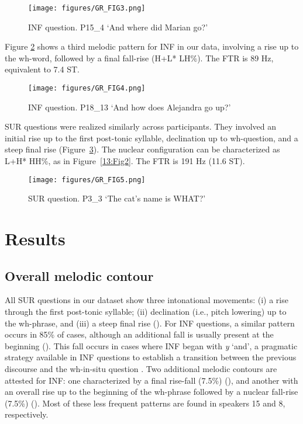 \documentclass[output=paper,colorlinks,citecolor=brown,draftmode]{langscibook}
\begin{document}
\begin{figure}
    \texttt{[image: figures/GR\_FIG3.png]}
    \caption{INF question. P15\_4  ‘And where did Marian go?’}
    \label{13:Fig3}
\end{figure}

Figure \ref{13:Fig4} shows a third melodic pattern for INF in our data, involving a rise up to the wh-word, followed by a final fall-rise (H+L* LH\%). The FTR is 89 Hz, equivalent to 7.4 ST.

\begin{figure}
    \texttt{[image: figures/GR\_FIG4.png]}
    \caption{INF question. P18\_13  ‘And how does Alejandra go up?’}
    \label{13:Fig4}
\end{figure}

SUR questions were realized similarly across participants. They involved an initial rise up to the first post-tonic syllable, declination up to wh-question, and a steep final rise (Figure~\ref{13:Fig5}). The nuclear configuration can be characterized as L+H* HH\%, as in Figure~\ref{13:Fig2}. The FTR is 191 Hz (11.6 ST).

\begin{figure}
    \texttt{[image: figures/GR\_FIG5.png]}
    \caption{SUR question. P3\_3  ‘The cat’s name is WHAT?’}
    \label{13:Fig5}
\end{figure}

\section{Results}\label{sec:13:4}
\subsection{Overall melodic contour}
All SUR questions in our dataset show three intonational movements: (i) a rise through the first post-tonic syllable; (ii) declination (i.e., pitch lowering) up to the wh-phrase, and (iii) a steep final rise (). For INF questions, a similar pattern occurs in 85\% of cases, although an additional fall is usually present at the beginning (). This fall occurs in cases where INF began with \textit{y} ‘and’, a pragmatic strategy available in INF questions to establish a transition between the previous discourse and the wh-in-situ question \citep{Jiménez1997}. Two additional melodic contours are attested for INF: one characterized by a final rise-fall (7.5\%) (), and another with an overall rise up to the beginning of the wh-phrase followed by a nuclear fall-rise (7.5\%) (). Most of these less frequent patterns are found in speakers 15 and 8, respectively.
\end{document}
